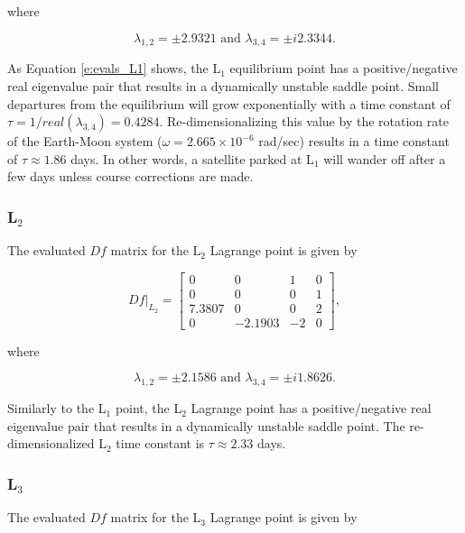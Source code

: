 \documentclass[11pt]{article} %
\begin{document}
\noindent
where

\begin{equation}
	\label{e:evals_L1}
	\lambda_{1,2} = \pm 2.9321 \text{ and } \lambda_{3,4} = \pm i2.3344.
\end{equation}

\noindent
As Equation \ref{e:evals_L1} shows, the L$_1$ equilibrium point has a positive/negative real eigenvalue pair that results in a dynamically unstable saddle point. Small departures from the equilibrium will grow exponentially with a time constant of $\tau = 1/real(\lambda_{3,4}) = 0.4284$. Re-dimensionalizing this value by the rotation rate of the Earth-Moon system ($\omega=2.665\times10^{-6}$ rad/sec) results in a time constant of $\tau\approx1.86$ days. In other words, a satellite parked at L$_1$ will wander off after a few days unless course corrections are made.

\subsubsection*{L$_2$}
The evaluated $Df$ matrix for the L$_2$ Lagrange point is given by

\doublespacing
\begin{equation}
	\label{e:df_eval_L2}
	Df|_{L_2} = 
	\begin{bmatrix} 
		0 & 0 & 1  & 0 \\ 
		0 & 0 & 0 & 1 \\
		7.3807 & 0 & 0 & 2 \\
		0 & -2.1903 & -2 & 0
	\end{bmatrix},
\end{equation}
\singlespacing

\noindent
where

\begin{equation}
	\label{e:evals_L2}
	\lambda_{1,2} = \pm 2.1586 \text{ and } \lambda_{3,4} = \pm i1.8626.
\end{equation}

\noindent
Similarly to the L$_1$ point, the L$_2$ Lagrange point has a positive/negative real eigenvalue pair that results in a dynamically unstable saddle point. The re-dimensionalized L$_2$ time constant is $\tau\approx2.33$ days. 

\subsubsection*{L$_3$}
The evaluated $Df$ matrix for the L$_3$ Lagrange point is given by
\end{document}
